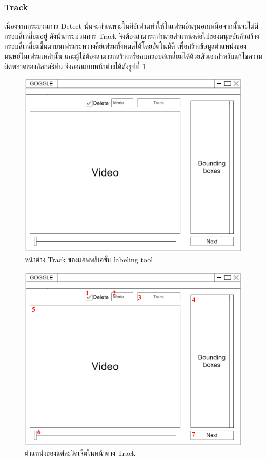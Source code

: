\subsubsection{Track}
เนื่องจากกระบวนการ Detect นั้นจะทำเฉพาะในคีย์เฟรมทำให้ในเฟรมอื่นๆนอกเหนือจากนั้นจะไม่มีกรอบสี่เหลี่ยมอยู่
ดังนั้นกระบวนการ Track จึงต้องสามารถทำนายตำแหน่งต่อไปของมนุษย์แล้วสร้างกรอบสี่เหลี่ยมขึ้นมาบนเฟรมระหว่างคีย์เฟรมทั้งหมดได้โดยอัตโนมัติ
เพื่อสร้างข้อมูลตำแหน่งของมนุษย์ในเฟรมเหล่านั้น และผู้ใช้ต้องสามารถสร้างหรือลบกรอบสี่เหลี่ยมได้ด้วยตัวเองสำหรับแก้ไขความผิดพลาดของอัลกอริทึม
จึงออกแบบหน้าต่างได้ดังรูปที่ \ref{fig:TrackDraft}
\begin{figure}[!ht]
    \centering
    \includegraphics[width=1\textwidth]{chapter3/images/3_6/TrackDraft.png}
    \caption{หน้าต่าง Track ของแอพพลิเคชั่น labeling tool}
    \label{fig:TrackDraft}
\end{figure}
\clearpage
\begin{figure}[!ht]
    \centering
    \includegraphics[width=1\textwidth]{chapter3/images/3_6/TrackDraft_point.png}
    \caption{ตำแหน่งของแต่ละวิดเจ็ตในหน้าต่าง Track}
    \label{fig:TrackDraft_point}
\end{figure}

